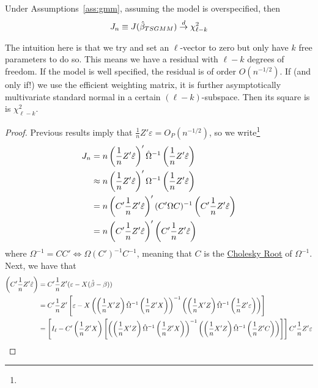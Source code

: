 \documentclass[10pt]{article}
\begin{document}
\begin{theorem}
	Under Assumptions~\ref{ass:gmm}, assuming the model is overspecified, then \[J_n \equiv J(\hat{\beta}_{TSGMM}) \overset{d}{\to} \chi^2_{\ell - k}\]
\end{theorem}
\begin{remark}
	The intuition here is that we try and set an $\ell$-vector to zero but only have $k$ free parameters to do so. This means we have a residual with $\ell - k$ degrees of freedom. If the model is well specified, the residual is of order $O(n^{-1/2})$. If (and only if!) we use the efficient weighting matrix, it is further asymptotically multivariate standard normal in a certain $(\ell - k)$-subspace. Then its square is is $\chi^2_{\ell - k}$.
\end{remark}
\begin{proof}
	Previous results imply that $\frac{1}{n}Z'\varepsilon = O_P(n^{-1/2})$, so we write\footnote{}
	\begin{align*}
		J_n &= n\left( \frac{1}{n} Z'\hat{\varepsilon}\right)' \hat{\Omega}^{-1} \left( \frac{1}{n} Z'\hat{\varepsilon}\right) \\
		&\approx n\left( \frac{1}{n} Z'\hat{\varepsilon}\right)' \Omega^{-1} \left( \frac{1}{n} Z'\hat{\varepsilon}\right) \\
		&= n \left( C' \frac{1}{n} Z'\hat{\varepsilon}\right)'(C'\Omega C)^{-1}\left( C' \frac{1}{n} Z'\hat{\varepsilon}\right) \\
		&= n \left( C' \frac{1}{n} Z'\hat{\varepsilon}\right)'\left( C' \frac{1}{n} Z'\hat{\varepsilon}\right)
	\end{align*}
	where $\Omega^{-1} = CC' \iff \Omega (C')^{-1} C^{-1}$, meaning that $C$ is the \href{https://en.wikipedia.org/wiki/Cholesky_decomposition}{Cholesky Root} of $\Omega^{-1}$. Next, we have that 
	\begin{align*}
		\parl C' \frac{1}{n} Z'\hat{\varepsilon}\parr &= C' \frac{1}{n} Z'(\varepsilon - X(\hat{\beta} - \beta)) \\ 
		&= C' \frac{1}{n} Z'\barl \varepsilon - X\parl \parl \frac{1}{n}X'Z\parr \hat{\Omega}^{-1} \parl \frac{1}{n}Z'X\parr\parr^{-1}\parl \parl \frac{1}{n}X'Z\parr \hat{\Omega}^{-1} \parl \frac{1}{n}Z'\varepsilon\parr\parr\barr \\
		&= \barl I_\ell - C'\parl \frac{1}{n} Z'X\parr \barl \parl \parl \frac{1}{n}X'Z\parr \hat{\Omega}^{-1} \parl \frac{1}{n}Z'X\parr\parr^{-1}\parl \parl \frac{1}{n}X'Z\parr \hat{\Omega}^{-1} \parl \frac{1}{n}Z'C\parr\parr  \barr\barr C' \frac{1}{n} Z'\varepsilon \\

\end{align*}
\end{proof}
\end{document}
